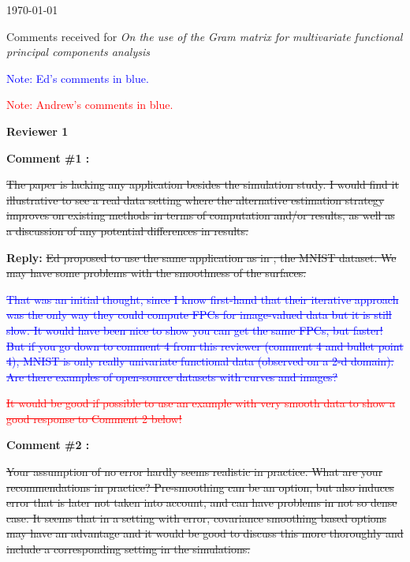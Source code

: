 \documentclass[11pt]{article}
\begin{document}
\newcommand{\thedate}{\today}

\thedate


\begin{center}
{\large Comments received for \emph{On the use of the Gram matrix for multivariate functional principal components analysis}}\\
\end{center} 

\textcolor{blue}{Note: Ed’s comments in blue.}

\textcolor{red}{Note: Andrew’s comments in blue.}

\vspace*{1cm}


{\large \textbf{Reviewer 1} }


\bigskip

\itshape


\textbf{Comment \#1 :}

\sout{The paper is lacking any application besides the simulation study. I would find it illustrative to see a real data setting where the alternative estimation strategy improves on existing methods in terms of computation and/or results, as well as a discussion of any potential differences in results.}

\medskip

\normalfont

\textbf{Reply:} \sout{Ed proposed to use the same application as in \cite{shiTwoDimensionalFunctionalPrincipal2022}, the MNIST dataset. We may have some problems with the smoothness of the surfaces.}

\textcolor{blue}{\sout{That was an initial thought, since I know first-hand that their iterative approach was the only way they could compute FPCs for image-valued data but it is still slow. It would have been nice to show you can get the same FPCs, but faster! But if you go down to comment 4 from this reviewer (comment 4 and bullet point 4), MNIST is only really univariate functional data (observed on a 2-d domain). Are there examples of open-source datasets with curves and images?}}

\textcolor{red}{\sout{It would be good if possible to use an example with very smooth data to show a good response to Comment 2 below!}}

\bigskip

\itshape

\textbf{Comment \#2 :}

\sout{Your assumption of no error hardly seems realistic in practice. What are your recommendations in practice? Pre-smoothing can be an option, but also induces error that is later not taken into account, and can have problems in not so dense case. It seems that in a setting with error, covariance smoothing based options may have an advantage and it would be good to discuss this more thoroughly and include a corresponding setting in the simulations.}
\end{document}
